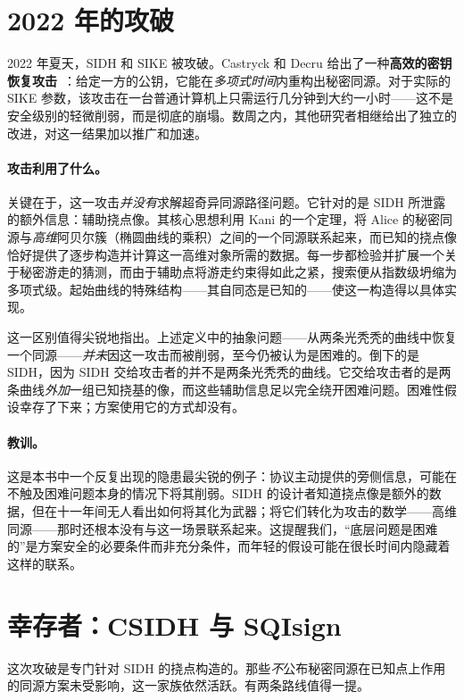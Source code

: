 \section{2022 年的攻破}

2022 年夏天，SIDH 和 SIKE 被攻破。Castryck 和 Decru 给出了一种\textbf{高效的密钥恢复攻击}~\cite{castryckdecru2023}：给定一方的公钥，它能在\emph{多项式时间}内重构出秘密同源。对于实际的 SIKE 参数，该攻击在一台普通计算机上只需运行几分钟到大约一小时——这不是安全级别的轻微削弱，而是彻底的崩塌。数周之内，其他研究者相继给出了独立的改进，对这一结果加以推广和加速。

\paragraph{攻击利用了什么。}
关键在于，这一攻击\emph{并没有}求解超奇异同源路径问题。它针对的是 SIDH 所泄露的额外信息：辅助挠点像。其核心思想利用 Kani 的一个定理，将 Alice 的秘密同源与\emph{高维}阿贝尔簇（椭圆曲线的乘积）之间的一个同源联系起来，而已知的挠点像恰好提供了逐步构造并计算这一高维对象所需的数据。每一步都检验并扩展一个关于秘密游走的猜测，而由于辅助点将游走约束得如此之紧，搜索便从指数级坍缩为多项式级。起始曲线的特殊结构——其自同态是已知的——使这一构造得以具体实现。

\begin{remark}
这一区别值得尖锐地指出。上述定义中的抽象问题——从两条光秃秃的曲线中恢复一个同源——\emph{并未}因这一攻击而被削弱，至今仍被认为是困难的。倒下的是 SIDH，因为 SIDH 交给攻击者的并不是两条光秃秃的曲线。它交给攻击者的是两条曲线\emph{外加}一组已知挠基的像，而这些辅助信息足以完全绕开困难问题。困难性假设幸存了下来；方案使用它的方式却没有。
\end{remark}

\paragraph{教训。}
这是本书中一个反复出现的隐患最尖锐的例子：协议主动提供的旁侧信息，可能在不触及困难问题本身的情况下将其削弱。SIDH 的设计者知道挠点像是额外的数据，但在十一年间无人看出如何将其化为武器；将它们转化为攻击的数学——高维同源——那时还根本没有与这一场景联系起来。这提醒我们，“底层问题是困难的”是方案安全的必要条件而非充分条件，而年轻的假设可能在很长时间内隐藏着这样的联系。

\section{幸存者：CSIDH 与 SQIsign}

这次攻破是专门针对 SIDH 的挠点构造的。那些\emph{不}公布秘密同源在已知点上作用的同源方案未受影响，这一家族依然活跃。有两条路线值得一提。

